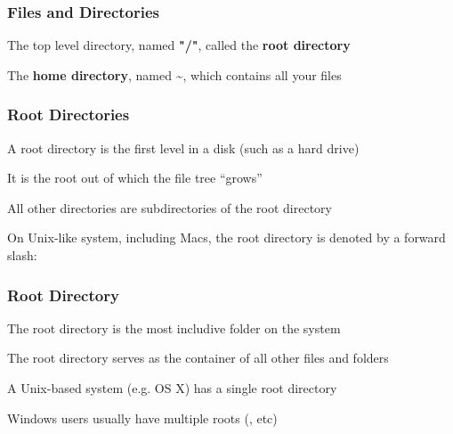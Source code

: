 \documentclass[12pt]{beamer}\usepackage[]{graphicx}\usepackage[]{color}
\begin{document}

\begin{frame}
\begin{center}
\Huge{}
\end{center}
\end{frame}


\begin{frame}[fragile]
\frametitle{Files and Directories}

\bbi
  \item The top level directory, named \textbf{"/"}, called the \textbf{root directory}
  \item The \textbf{home directory}, named \textbf{\textasciitilde}, which contains all your files
\ei
\eb

\end{frame}


\begin{frame}[fragile]
\frametitle{Root Directories}

\bi
  \item A root directory is the first level in a disk (such as a hard drive)
  \item It is the root out of which the file tree ``grows''
  \item All other directories are subdirectories of the root directory
  \item On Unix-like system, including Macs, the root directory is denoted by a forward slash: {\hilit \code{/}}
\ei

\end{frame}


\begin{frame}
\frametitle{Root Directory}

\bi
  \item The root directory is the most includive folder on the system
  \item The root directory serves as the container of all other files and folders
  \item A Unix-based system (e.g. OS X) has a single root directory
  \item Windows users usually have multiple roots (, etc)
\ei

\end{frame}
\end{document}
